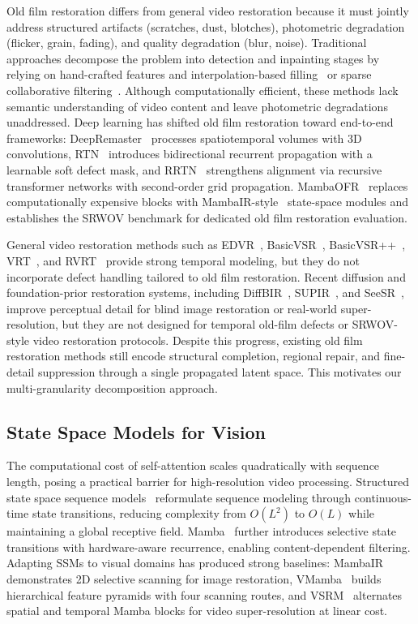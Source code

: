 Old film restoration differs from general video restoration because it must jointly address structured artifacts (scratches, dust, blotches), photometric degradation (flicker, grain, fading), and quality degradation (blur, noise). Traditional approaches decompose the problem into detection and inpainting stages by relying on hand-crafted features and interpolation-based filling~\cite{kokaram2004missing} or sparse collaborative filtering~\cite{dabov2007bm3d,he2013guided}. Although computationally efficient, these methods lack semantic understanding of video content and leave photometric degradations unaddressed. Deep learning has shifted old film restoration toward end-to-end frameworks: DeepRemaster~\cite{iizuka2019deepremaster} processes spatiotemporal volumes with 3D convolutions, RTN~\cite{wan2022rtn} introduces bidirectional recurrent propagation with a learnable soft defect mask, and RRTN~\cite{lin2024rrtn} strengthens alignment via recursive transformer networks with second-order grid propagation. MambaOFR~\cite{mao2025mambaofr} replaces computationally expensive blocks with MambaIR-style~\cite{guo2024mambair} state-space modules and establishes the SRWOV benchmark for dedicated old film restoration evaluation.

General video restoration methods such as EDVR~\cite{wang2019edvr}, BasicVSR~\cite{chan2021basicvsr}, BasicVSR++~\cite{chan2022basicvsrpp}, VRT~\cite{liang2024vrt}, and RVRT~\cite{liang2022rvrt} provide strong temporal modeling, but they do not incorporate defect handling tailored to old film restoration. Recent diffusion and foundation-prior restoration systems, including DiffBIR~\cite{lin2024diffbir}, SUPIR~\cite{yu2024supir}, and SeeSR~\cite{wu2024seesr}, improve perceptual detail for blind image restoration or real-world super-resolution, but they are not designed for temporal old-film defects or SRWOV-style video restoration protocols. Despite this progress, existing old film restoration methods still encode structural completion, regional repair, and fine-detail suppression through a single propagated latent space. This motivates our multi-granularity decomposition approach.

\subsection{State Space Models for Vision}
\label{subsec:ssm}

The computational cost of self-attention scales quadratically with sequence length, posing a practical barrier for high-resolution video processing. Structured state space sequence models~\cite{gu2022s4} reformulate sequence modeling through continuous-time state transitions, reducing complexity from $O(L^2)$ to $O(L)$ while maintaining a global receptive field. Mamba~\cite{gu2024mamba} further introduces selective state transitions with hardware-aware recurrence, enabling content-dependent filtering. Adapting SSMs to visual domains has produced strong baselines: MambaIR~\cite{guo2024mambair} demonstrates 2D selective scanning for image restoration, VMamba~\cite{liu2024vmamba} builds hierarchical feature pyramids with four scanning routes, and VSRM~\cite{tran2025vsrm} alternates spatial and temporal Mamba blocks for video super-resolution at linear cost.

